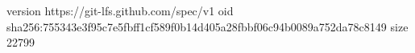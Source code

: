 version https://git-lfs.github.com/spec/v1
oid sha256:755343e3f95c7e5fbff1cf589f0b14d405a28fbbf06c94b0089a752da78c8149
size 22799
